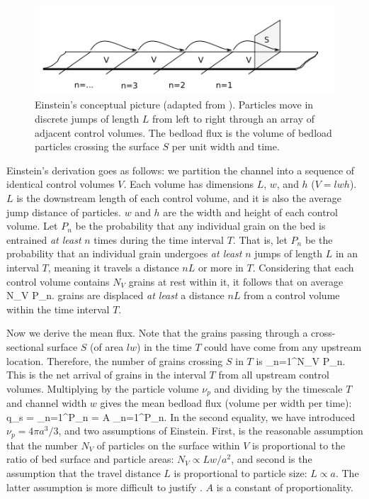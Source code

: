 \begin{figure}
	\centering
	\includegraphics[width=.98\linewidth]{./figures/ch1/yalindrawing.png}
	\caption{Einstein's conceptual picture (adapted from \citet{Yalin1972}). Particles move in discrete jumps of length $L$ from left to right through an array of adjacent control volumes. The bedload flux is the volume of bedload particles crossing the surface $S$ per unit width and time. \label{fig:yalin}}
\end{figure}

Einstein's derivation goes as follows: we partition the channel into a sequence of identical control volumes $V$. 
Each volume has dimensions $L$, $w$, and $h$ ($V=lwh$). 
$L$ is the downstream length of each control volume, and it is also the average jump distance of particles. 
$w$ and $h$ are the width and height of each control volume.
Let $P_n$ be the probability that any individual grain on the bed is entrained \textit{at least} $n$ times during the time interval $T$. 
That is, let $P_n$ be the probability that an individual grain undergoes \textit{at least} $n$ jumps of length $L$ in an interval $T$, meaning it travels a distance $nL$ or more in $T$. 
Considering that each control volume contains $N_V$ grains at rest within it, it follows that on average
\be N_V P_n. \ee
grains are displaced \textit{at least} a distance $nL$ from a control volume within the time interval $T$.

Now we derive the mean flux. 
Note that the grains passing through a cross-sectional surface $S$ (of area $lw$) in the time $T$ could have come from any upstream location. 
Therefore, the number of grains crossing $S$ in $T$ is 
\be \sum_{n=1}^\infty N_V P_n. \ee
This is the net arrival of grains in the interval $T$ from all upstream control volumes. 
Multiplying by the particle volume $\nu_p$ and dividing by the timescale $T$ and channel width $w$ gives the mean bedload flux (volume per width per time):
\be \bra q_s \ket = \sum_{n=1}^\infty P_n = A  \sum_{n=1}^\infty P_n. \label{eq:einstein1}\ee 
In the second equality, we have introduced $\nu_p = 4\pi a^3/3$, and two assumptions of Einstein. First, is the reasonable assumption that the number $N_V$ of particles on the surface within $V$ is proportional to the ratio of bed surface and particle areas: $N_V \propto Lw/a^2$, and second is the assumption that the travel distance $L$ is proportional to particle size: $L \propto a$. The latter assumption is more difficult to justify \citep[e.g.][]{Yalin1972}. 
$A$ is a constant of proportionality. 

